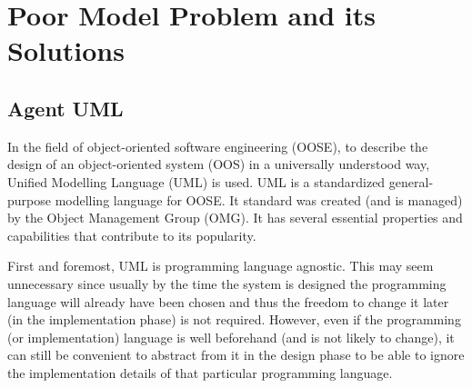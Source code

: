 
\chapter{Poor Model Problem and its Solutions}

\section{Agent UML}


In the field of object-oriented software engineering (OOSE), to describe the design of an object-oriented system (OOS) in a universally understood way, Unified Modelling Language (UML) is used.
UML is a standardized general-purpose modelling language for OOSE.
It standard was created (and is managed) by the Object Management Group (OMG).
It has several essential properties and capabilities that contribute to its popularity.

First and foremost, UML is programming language agnostic.
This may seem unnecessary since usually by the time the system is designed the programming language will already have been chosen and thus the freedom to change it later (in the implementation phase) is not required.
However, even if the programming (or implementation) language is well beforehand (and is not likely to change), it can still be convenient to abstract from it in the design phase to be able to ignore the implementation details of that particular programming language.

